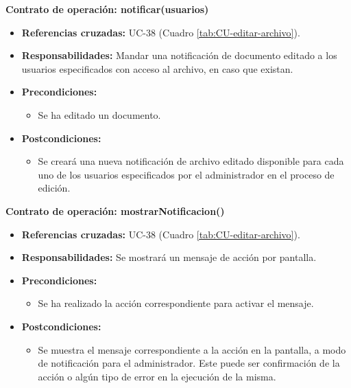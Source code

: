 \textbf{Contrato de operación: notificar(usuarios)}
\begin{itemize}
\item \textbf{Referencias cruzadas:} UC-38 (Cuadro \ref{tab:CU-editar-archivo}).
\item \textbf{Responsabilidades:} Mandar una notificación de documento editado a los usuarios especificados con acceso al archivo, en caso que existan.
\item \textbf{Precondiciones:} 
 \begin{itemize}
\item Se ha editado un documento.
\end {itemize}
\item \textbf{Postcondiciones:} 
 \begin{itemize}
\item Se creará una nueva notificación de archivo editado disponible para cada uno de los usuarios especificados por el administrador en el proceso de edición.
\end {itemize}
\end {itemize}

\textbf{Contrato de operación: mostrarNotificacion()}
\begin{itemize}
\item \textbf{Referencias cruzadas:} UC-38 (Cuadro \ref{tab:CU-editar-archivo}).
\item \textbf{Responsabilidades:} Se mostrará un mensaje de acción por pantalla.
\item \textbf{Precondiciones:} 
 \begin{itemize}
\item Se ha realizado la acción correspondiente para activar el mensaje.
\end {itemize}
\item \textbf{Postcondiciones:} 
 \begin{itemize}
\item Se muestra el mensaje correspondiente a la acción en la pantalla, a modo de notificación para el administrador. Este puede ser confirmación de la acción o algún tipo de error en la ejecución de la misma.
\end {itemize}
\end {itemize}


\vspace{10mm}

